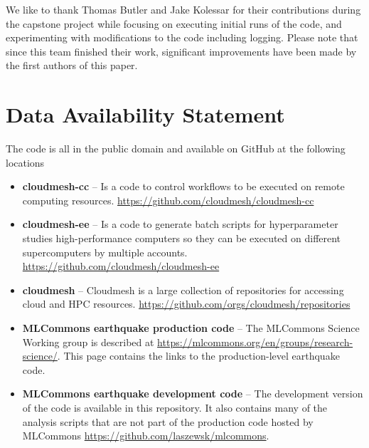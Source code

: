 \documentclass[utf8]{FrontiersinVancouver} %
\begin{document}
We like to thank Thomas Butler and Jake Kolessar for their contributions during the capstone project while focusing on executing initial runs of the code, and experimenting with modifications to the code including logging. Please note that since this team finished their work, significant improvements have been made by the first authors of this paper.


\section*{Data Availability Statement}

The code is all in the public domain and available on GitHub at the following locations

\begin{itemize}

\item {\bf cloudmesh-cc} -- Is a code to control workflows to be executed on
  remote computing
  resources. \url{https://github.com/cloudmesh/cloudmesh-cc}

\item {\bf cloudmesh-ee} -- Is a code to generate batch scripts for
  hyperparameter studies high-performance computers so they can be
  executed on different supercomputers by multiple
  accounts. \url{https://github.com/cloudmesh/cloudmesh-ee}

\item {\bf cloudmesh} -- Cloudmesh is a large collection of repositories for
  accessing cloud and HPC
  resources. \url{https://github.com/orgs/cloudmesh/repositories}

\item {\bf MLCommons earthquake production code} -- The MLCommons Science
  Working group is described at
  \url{https://mlcommons.org/en/groups/research-science/}. This page
  contains the links to the production-level earthquake code.

\item {\bf MLCommons earthquake development code} -- The development version of
  the code is available in this repository. It also contains many of
  the analysis scripts that are not part of the production code
  hosted by MLCommons \url{https://github.com/laszewsk/mlcommons}.

\end{itemize}


% 



\end{document}
